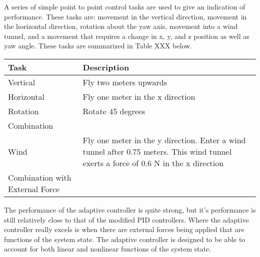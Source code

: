 \documentclass[letterpaper,12pt,titlepage,oneside,final]{book}
\begin{document}
A series of simple point to point control tasks are used to give an indication of performance. 
These tasks are: movement in the vertical direction, movement in the horizontal direction, rotation about the yaw axis, movement into a wind tunnel, and a movement that requires a change in x, y, and z position as well as yaw angle. 
These tasks are summarized in Table XXX below.


\begin{center}
\begin{tabular}{| l | p{9cm} |}

\hline
Task & Description \\ \hline
Vertical & Fly two meters upwards \\ \hline
Horizontal & Fly one meter in the x direction \\ \hline
Rotation & Rotate 45 degrees \\ \hline
Combination & \\ \hline
Wind & Fly one meter in the y direction. Enter a wind tunnel after 0.75 meters. This wind tunnel exerts a force of 0.6 N in the x direction \\ \hline
Combination with External Force & \\ \hline

\end{tabular}
\end{center}



The performance of the adaptive controller is quite strong, but it’s performance is still relatively close to that of the modified PID controllers. 
Where the adaptive controller really excels is when there are external forces being applied that are functions of the system state. 
The adaptive controller is designed to be able to account for both linear and nonlinear functions of the system state.
\end{document}
